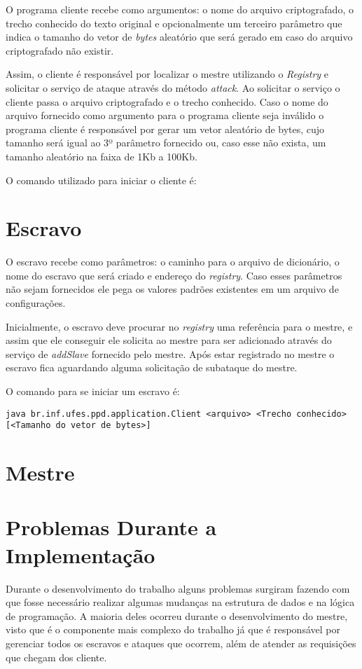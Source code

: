 \documentclass[
	12pt,				%
    oneside,			%
	a4paper,			%
	english,			%
	brazil,				%
	]{abntex2}
\begin{document}
O programa cliente recebe como argumentos: o nome do arquivo criptografado, o trecho conhecido do texto original e opcionalmente um terceiro parâmetro que indica o tamanho do vetor de \textit{bytes} aleatório que será gerado em caso do arquivo criptografado não existir.

Assim, o cliente é responsável por localizar o mestre utilizando o \textit{Registry} e solicitar o serviço de ataque através do método \textit{attack}. Ao solicitar o serviço o cliente passa o arquivo criptografado e o trecho conhecido. Caso o nome do arquivo fornecido como argumento para o programa cliente seja inválido o programa cliente é responsável por gerar um vetor aleatório de bytes, cujo tamanho será igual ao 3º parâmetro fornecido ou, caso esse não exista, um tamanho aleatório na faixa de 1Kb a 100Kb.

O comando utilizado para iniciar o cliente é:



\section{Escravo}
O escravo recebe como parâmetros: o caminho para o arquivo de dicionário, o nome do escravo que será criado e endereço do \textit{registry}. Caso esses parâmetros não sejam fornecidos ele pega os valores padrões existentes em um arquivo de configurações.

Inicialmente, o escravo deve procurar no \textit{registry} uma referência para o mestre, e assim que ele conseguir ele solicita ao mestre para ser adicionado através do serviço de \textit{addSlave} fornecido pelo mestre. Após estar registrado
no mestre o escravo fica aguardando alguma solicitação de subataque do mestre. 

O comando para se iniciar um escravo é:

\begin{lstlisting}
java br.inf.ufes.ppd.application.Client <arquivo> <Trecho conhecido> [<Tamanho do vetor de bytes>]\end{lstlisting}


\section{Mestre}




\section{Problemas Durante a Implementação}
Durante o desenvolvimento do trabalho alguns problemas surgiram fazendo com que fosse necessário realizar algumas mudanças
na estrutura de dados e na lógica de programação. A maioria deles ocorreu durante o desenvolvimento do mestre, visto que
é o componente mais complexo do trabalho já que é responsável por gerenciar todos os escravos e ataques que ocorrem, além de 
atender as requisições que chegam dos cliente. 
\end{document}
